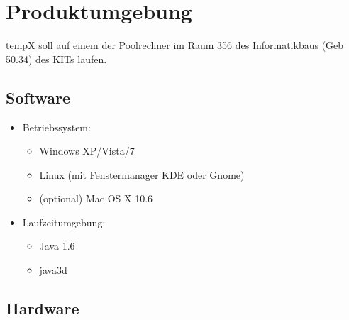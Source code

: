 \section{Produktumgebung}

\label{sec:produktumgebung}

\gls{tempX} soll auf einem der Poolrechner im Raum 356 des Informatikbaus (Geb 50.34) des KITs laufen.

\subsection{Software}

\label{subsec:software}

	\begin{itemize}
		
		\item Betriebssystem: 

			\begin{itemize}

				\item Windows XP/Vista/7

				\item Linux (mit Fenstermanager KDE oder Gnome)

				\item (optional) Mac OS X 10.6

			\end{itemize}
	
		\item Laufzeitumgebung:
		
			\begin{itemize}
				
				\item Java 1.6
				
				\item \gls{java3d}
				
			\end{itemize}
		
	\end{itemize}
	
\subsection{Hardware}

